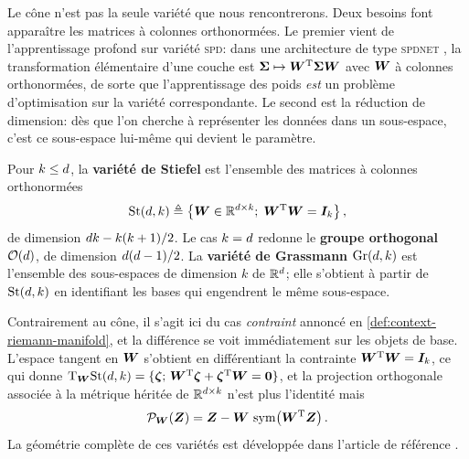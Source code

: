 Le cône n'est pas la seule variété que nous rencontrerons. Deux besoins font apparaître les matrices à colonnes orthonormées. Le premier vient de l'apprentissage profond sur variété \textsc{spd}: dans une architecture de type \textsc{spdnet} , la transformation élémentaire d'une couche est $\boldsymbol{\Sigma}\mapsto\boldsymbol{W}^{\mathrm{T}}\boldsymbol{\Sigma}\boldsymbol{W}$ avec $\boldsymbol{W}$ à colonnes orthonormées, de sorte que l'apprentissage des poids \emph{est} un problème d'optimisation sur la variété correspondante. Le second est la réduction de dimension: dès que l'on cherche à représenter les données dans un sous-espace, c'est ce sous-espace lui-même qui devient le paramètre.

\begin{definition}
\label{def:context-riemann-stiefel}
  Pour $k\leq d$, la \textbf{variété de Stiefel} est l'ensemble des matrices à colonnes orthonormées
  \begin{equation}
    \mathrm{St}(d,k)
    \triangleq
    \left\{ \boldsymbol{W}\in\mathbb{R}^{d\times k};\; \boldsymbol{W}^{\mathrm{T}}\boldsymbol{W}=\boldsymbol{I}_{k} \right\},
    \label{eq:context-riemann-stiefel}
  \end{equation}
  de dimension $d k - k(k+1)/2$. Le cas $k=d$ redonne le \textbf{groupe orthogonal} $\mathcal{O}(d)$, de dimension $d(d-1)/2$. La \textbf{variété de Grassmann} $\mathrm{Gr}(d,k)$ est l'ensemble des sous-espaces de dimension $k$ de $\mathbb{R}^d$; elle s'obtient à partir de $\mathrm{St}(d,k)$ en identifiant les bases qui engendrent le même sous-espace.
\end{definition}

Contrairement au cône, il s'agit ici du cas \emph{contraint} annoncé en \cref{def:context-riemann-manifold}, et la différence se voit immédiatement sur les objets de base. L'espace tangent en $\boldsymbol{W}$ s'obtient en différentiant la contrainte $\boldsymbol{W}^{\mathrm{T}}\boldsymbol{W}=\boldsymbol{I}_{k}$, ce qui donne $\mathrm{T}_{\boldsymbol{W}}\mathrm{St}(d,k)=\{\boldsymbol{\zeta};\,\boldsymbol{W}^{\mathrm{T}}\boldsymbol{\zeta}+\boldsymbol{\zeta}^{\mathrm{T}}\boldsymbol{W}=\boldsymbol{0}\}$, et la projection orthogonale associée à la métrique héritée de $\mathbb{R}^{d\times k}$ n'est plus l'identité mais
\begin{equation}
  \mathcal{P}_{\boldsymbol{W}}(\boldsymbol{Z})
  =
  \boldsymbol{Z} - \boldsymbol{W}\,\operatorname{\operatorname{sym}}\!\left(\boldsymbol{W}^{\mathrm{T}}\boldsymbol{Z}\right).
  \label{eq:context-riemann-projstiefel}
\end{equation}
La géométrie complète de ces variétés est développée dans l'article de référence .

